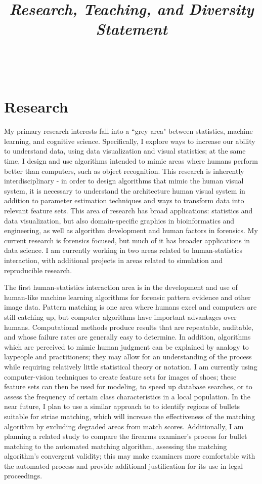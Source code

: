 \documentclass[12pt, letterpaper, sans]{moderncv}
\title{\emph{Research, Teaching, and Diversity Statement}}
\makeatletter
\newcommand{\makesimpletitle}{%
  \recomputeletterlengths%

  \begin{varwidth}[c]{.75\textwidth}
  \if@left\raggedright\fi%
      \if@right\raggedleft\fi%
      \ifthenelse{\equal{\@title}{}}{}{\titlestyle{\@title}}%
  \end{varwidth}\hfill
  \begin{varwidth}[c]{.25\textwidth}%
      \raggedleft%
      \addressfont\textcolor{color2}{%
        {\bfseries\upshape\@firstname~\@lastname}\\
        \ifthenelse{\isundefined{\@addressstreet}}{}{\makenewline\addresssymbol\@addressstreet%
          \ifthenelse{\equal{\@addresscity}{}}{}{\makenewline\@addresscity}%
          \ifthenelse{\equal{\@addresscountry}{}}{}{\makenewline\@addresscountry}}%
        \collectionloop{phones}{%
          \makenewline\csname\collectionloopkey phonesymbol\endcsname\collectionloopitem}%
        \ifthenelse{\isundefined{\@email}}{}{\makenewline\emailsymbol\emaillink{\@email}}%
        \ifthenelse{\isundefined{\@homepage}}{}{\makenewline\homepagesymbol\httplink{\@homepage}}%
        \ifthenelse{\isundefined{\@extrainfo}}{}{\makenewline\@extrainfo}}
    \end{varwidth}
}
\makeatother
\begin{document}
\makesimpletitle

\section{Research}

My primary research interests fall into a ``grey area" between statistics, machine learning, and cognitive science. Specifically, I explore ways to increase our ability to understand data, using data visualization and visual statistics; at the same time, I design and use algorithms intended to mimic areas where humans perform better than computers, such as object recognition. This research is inherently interdisciplinary - in order to design algorithms that mimic the human visual system, it is necessary to understand the architecture human visual system in addition to parameter estimation techniques and ways to transform data into relevant feature sets. This area of research has broad applications: statistics and data visualization, but also domain-specific graphics in bioinformatics and engineering, as well as algorithm development and human factors in forensics. My current research is forensics focused, but much of it has broader applications in data science. I am currently working in two areas related to human-statistics interaction, with additional projects in areas related to simulation and reproducible research. 

The first human-statistics interaction area is in the development and use of human-like machine learning algorithms for forensic pattern evidence and other image data. Pattern matching is one area where humans excel and computers are still catching up, but computer algorithms have important advantages over humans. Computational methods produce results that are repeatable, auditable, and whose failure rates are generally easy to determine. In addition, algorithms which are perceived to mimic human judgment can be explained by analogy to laypeople and practitioners; they may allow for an understanding of the process while requiring relatively little statistical theory or notation. I am currently using computer-vision techniques to create feature sets for images of shoes; these feature sets can then be used for modeling, to speed up database searches, or to assess the frequency of certain class characteristics in a local population. In the near future, I plan to use a similar approach to to identify regions of bullets suitable for striae matching, which will increase the effectiveness of the matching algorithm by excluding degraded areas from match scores. Additionally, I am planning a related study to compare the firearms examiner's process for bullet matching to the automated matching algorithm, assessing the matching algorithm's convergent validity; this may make examiners more comfortable with the automated process and provide additional justification for its use in legal proceedings. 
\end{document}
